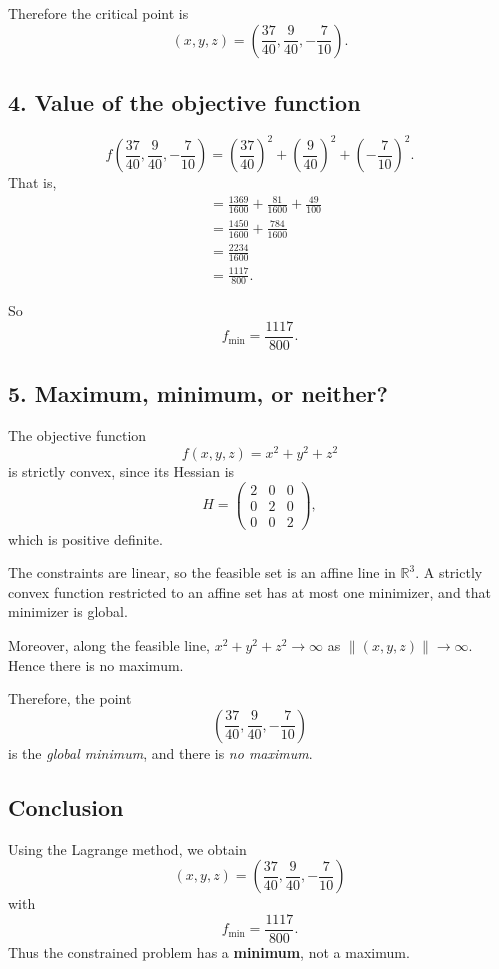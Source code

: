 Therefore the critical point is
\[
\boxed{
\left(x,y,z\right)=\left(\frac{37}{40},\frac{9}{40},-\frac{7}{10}\right).
}
\]

\subsection*{4. Value of the objective function}

\[
f\left(\frac{37}{40},\frac{9}{40},-\frac{7}{10}\right)
=
\left(\frac{37}{40}\right)^2
+
\left(\frac{9}{40}\right)^2
+
\left(-\frac{7}{10}\right)^2.
\]
That is,
\[
\begin{aligned}
&=
\frac{1369}{1600}
+
\frac{81}{1600}
+
\frac{49}{100}\\
&=
\frac{1450}{1600}+\frac{784}{1600}\\
&=
\frac{2234}{1600}\\
&=
\frac{1117}{800}.
\end{aligned}
\]

So
\[
\boxed{
f_{\min}=\frac{1117}{800}.
}
\]

\subsection*{5. Maximum, minimum, or neither?}

The objective function
\[
f(x,y,z)=x^2+y^2+z^2
\]
is strictly convex, since its Hessian is
\[
H=
\begin{pmatrix}
2 & 0 & 0\\
0 & 2 & 0\\
0 & 0 & 2
\end{pmatrix},
\]
which is positive definite.

The constraints are linear, so the feasible set is an affine line in \(\mathbb{R}^3\). A strictly convex function restricted to an affine set has at most one minimizer, and that minimizer is global.

Moreover, along the feasible line, \(x^2+y^2+z^2\to \infty\) as \(\|(x,y,z)\|\to\infty\). Hence there is no maximum.

Therefore, the point
\[
\boxed{
\left(\frac{37}{40},\frac{9}{40},-\frac{7}{10}\right)
}
\]
is the \emph{global minimum}, and there is \emph{no maximum}.

\subsection*{Conclusion}

Using the Lagrange method, we obtain
\[
\boxed{
\left(x,y,z\right)=\left(\frac{37}{40},\frac{9}{40},-\frac{7}{10}\right)
}
\]
with
\[
\boxed{
f_{\min}=\frac{1117}{800}.
}
\]
Thus the constrained problem has a \textbf{minimum}, not a maximum.



